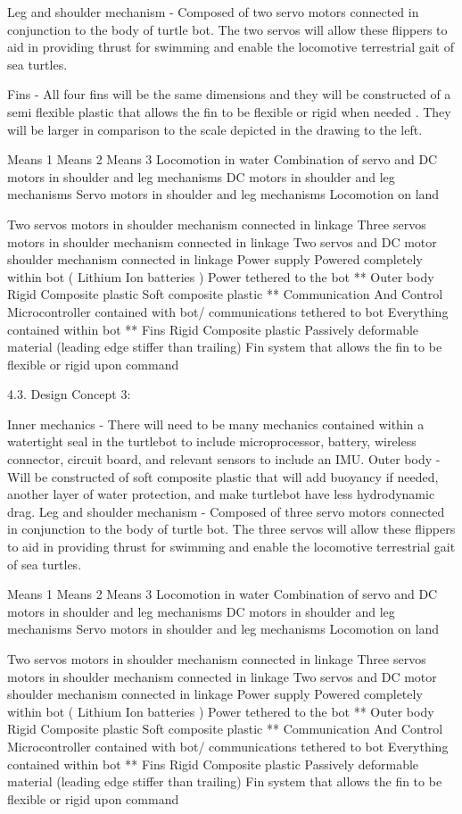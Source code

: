 Leg and shoulder mechanism - Composed of two servo motors connected in conjunction to the body of turtle bot. The two servos will allow these flippers to aid in providing thrust for swimming and enable the locomotive terrestrial gait of sea turtles.  

Fins - All four fins will be the same dimensions and they will be constructed of a semi flexible plastic that allows the fin to be flexible or rigid when needed . They will be larger in comparison to the scale depicted in the drawing to the left. 


Means 1
Means 2
Means 3
Locomotion in water 
Combination of servo and DC motors in shoulder and leg mechanisms 
DC motors in shoulder and leg mechanisms
Servo motors in shoulder and leg mechanisms
Locomotion on land 

Two servos motors in shoulder mechanism connected in linkage 
Three servos motors in shoulder mechanism connected in linkage 
Two servos and DC motor shoulder mechanism connected in linkage 
Power supply 
Powered completely within bot ( Lithium Ion batteries )
Power tethered to the bot 
**
Outer body 
Rigid Composite plastic 
Soft composite plastic
**
Communication
 And Control
Microcontroller contained with bot/ communications tethered to bot
Everything contained within bot 
**
Fins 
Rigid Composite plastic
Passively deformable material (leading edge stiffer than trailing) 
Fin system that allows the fin to be flexible or rigid upon command 

        4.3. Design Concept 3: 

Inner mechanics - There will need to be many mechanics contained within a watertight seal in the turtlebot to include microprocessor, battery, wireless connector, circuit board, and relevant sensors to include an IMU.
Outer body - Will be constructed of soft composite plastic that will add buoyancy if needed, another layer of water protection, and make turtlebot have less hydrodynamic drag. 
Leg and shoulder mechanism - Composed of three servo motors connected in conjunction to the body of turtle bot. The three servos will allow these flippers to aid in providing thrust for swimming and enable the locomotive terrestrial gait of sea turtles.


Means 1
Means 2
Means 3
Locomotion in water 
Combination of servo and DC motors in shoulder and leg mechanisms 
DC motors in shoulder and leg mechanisms
Servo motors in shoulder and leg mechanisms
Locomotion on land 

Two servos motors in shoulder mechanism connected in linkage 
Three servos motors in shoulder mechanism connected in linkage 
Two servos and DC motor shoulder mechanism connected in linkage 
Power supply 
Powered completely within bot ( Lithium Ion batteries )
Power tethered to the bot 
**
Outer body 
Rigid Composite plastic 
Soft composite plastic
**
Communication
 And Control
Microcontroller contained with bot/ communications tethered to bot
Everything contained within bot 
**
Fins 
Rigid Composite plastic
Passively deformable material (leading edge stiffer than trailing) 
Fin system that allows the fin to be flexible or rigid upon command 

